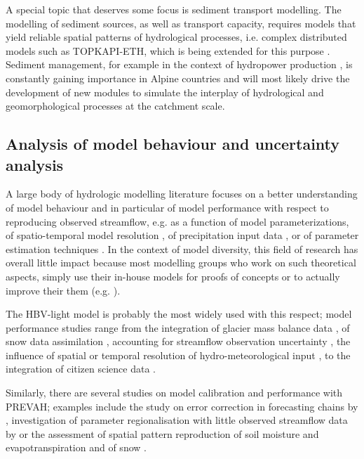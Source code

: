 \documentclass[10pt,a4paper]{article}
\begin{document}
A special topic that deserves some focus is sediment transport
modelling. The modelling of sediment sources, as well as transport
capacity, requires models that yield reliable spatial patterns of
hydrological processes, i.e. complex distributed models such as
TOPKAPI-ETH, which is being extended for this
purpose \citep{Konz_2011,Battista2020}. Sediment management, for example in the
context of hydropower production \citep{RaymondPralong2015,Gabbud2015}, is constantly
gaining importance in Alpine countries and will most likely drive the
development of new modules to simulate the interplay of hydrological and
geomorphological processes at the catchment scale.

\subsection{Analysis of model behaviour and uncertainty analysis}
\label{sec:application:uncertainty}

A large body of hydrologic modelling literature focuses on a better
understanding of model behaviour and in particular of model performance
with respect to reproducing observed streamflow, e.g. as a function of
model parameterizations, of spatio-temporal model resolution
\citep{Brunner_2019}, of precipitation input data \citep{Sikorska2016,Muller-Thomy2019}, 
or of parameter estimation techniques \citep{Foglia_2009}. In the
context of model diversity, this field of research has overall little
impact because most modelling groups who work on such theoretical
aspects, simply use their in-house models for proofs of concepts or to
actually improve their them (e.g. \citealt{Schaefli2007,Hingray2010}).

The HBV-light model is probably the most widely used with this respect;
model performance studies range from the integration of glacier mass
balance data \citep{Finger2015,schaeflihuss11}, of snow data
assimilation \citep{Griessinger2016}, accounting for streamflow observation
uncertainty \citep{Westerberg2020}, the influence of spatial or temporal
resolution of hydro-meteorological input \citep{GironsLopez2016,Sikorska2018}, to the
integration of citizen science data \citep{Etter2020}.

Similarly, there are several studies on model calibration and
performance with PREVAH; examples include the study on error correction
in forecasting chains by \citet{Bogner_2018}, investigation of parameter
regionalisation with little observed streamflow data
by \citet{Viviroli2015} or the assessment of spatial pattern reproduction
of soil moisture and evapotranspiration \citep{Zappa2003} and of snow
\citep{Zappa2008a}.
\end{document}
